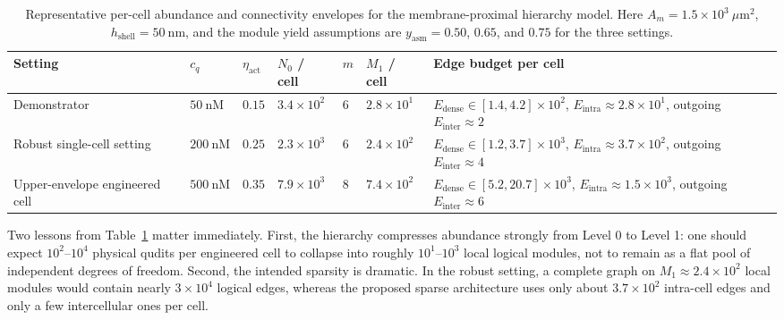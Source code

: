 \documentclass[11pt]{report}
\theoremstyle{definition}
\begin{document}
\begin{table}[ht]
\centering
\small
\caption{Representative per-cell abundance and connectivity envelopes for the membrane-proximal hierarchy model. Here $A_m=1.5\times10^3~\mu\mathrm{m}^2$, $h_{\mathrm{shell}}=50~\mathrm{nm}$, and the module yield assumptions are $y_{\mathrm{asm}}=0.50$, $0.65$, and $0.75$ for the three settings.}
\begin{tabularx}{\textwidth}{>{\raggedright\arraybackslash}p{2.2cm} >{\centering\arraybackslash}p{1.3cm} >{\centering\arraybackslash}p{1.4cm} >{\centering\arraybackslash}p{1.5cm} >{\centering\arraybackslash}p{1.0cm} >{\centering\arraybackslash}p{1.5cm} X}
\toprule
Setting & $c_q$ & $\eta_{\mathrm{act}}$ & $N_0$ / cell & $m$ & $M_1$ / cell & Edge budget per cell \\
\midrule
Demonstrator & $50~\mathrm{nM}$ & $0.15$ & $3.4\times10^2$ & $6$ & $2.8\times10^1$ & $E_{\mathrm{dense}}\in[1.4,4.2]\times10^2$, $E_{\mathrm{intra}}\approx 2.8\times10^1$, outgoing $E_{\mathrm{inter}}\approx 2$ \\
Robust single-cell setting & $200~\mathrm{nM}$ & $0.25$ & $2.3\times10^3$ & $6$ & $2.4\times10^2$ & $E_{\mathrm{dense}}\in[1.2,3.7]\times10^3$, $E_{\mathrm{intra}}\approx 3.7\times10^2$, outgoing $E_{\mathrm{inter}}\approx 4$ \\
Upper-envelope engineered cell & $500~\mathrm{nM}$ & $0.35$ & $7.9\times10^3$ & $8$ & $7.4\times10^2$ & $E_{\mathrm{dense}}\in[5.2,20.7]\times10^3$, $E_{\mathrm{intra}}\approx 1.5\times10^3$, outgoing $E_{\mathrm{inter}}\approx 6$ \\
\bottomrule
\end{tabularx}
\label{tab:hierarchy-resource}
\end{table}

Two lessons from Table~\ref{tab:hierarchy-resource} matter immediately. First, the hierarchy compresses abundance strongly from Level 0 to Level 1: one should expect $10^2$--$10^4$ physical qudits per engineered cell to collapse into roughly $10^1$--$10^3$ local logical modules, not to remain as a flat pool of independent degrees of freedom. Second, the intended sparsity is dramatic. In the robust setting, a complete graph on $M_1\approx 2.4\times 10^2$ local modules would contain nearly $3\times10^4$ logical edges, whereas the proposed sparse architecture uses only about $3.7\times10^2$ intra-cell edges and only a few intercellular ones per cell.
\end{document}
